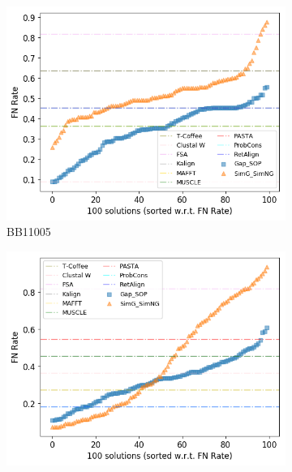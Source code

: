 


\begin{figure}[!htbp]
	\begin{adjustwidth}{-1cm}{-1cm}
	\centering
	\begin{subfigure}{0.22\textwidth}
		\includegraphics[width=\columnwidth]{Figure/summary/precomputedInit/Balibase/BB11005_fnrate_density_single_run}
		\caption{BB11005}
	\end{subfigure}	
	\begin{subfigure}{0.22\textwidth}
		\includegraphics[width=\columnwidth]{Figure/summary/precomputedInit/Balibase/BB11018_fnrate_density_single_run}

\end{subfigure}
\end{adjustwidth}
\end{figure}
